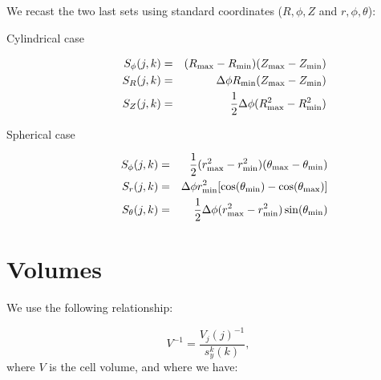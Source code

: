 \documentclass{article}
\begin{document}
We recast the two last sets using standard coordinates ($R,\phi,Z$ and $r,\phi,\theta$):
\begin{description}
\item[Cylindrical case] 
  \begin{eqnarray}
    \label{eq:3}
    S_\phi(j,k) &=& (R_{\rm max}-R_{\rm min})(Z_{\rm max}-Z_{\rm min})\\
    S_R(j,k) &=& \Delta \phi R_{\rm min}(Z_{\rm max}-Z_{\rm min})\\
    S_Z(j,k) &=& \frac 12\Delta\phi(R_{\rm max}^2-R_{\rm min}^2)
  \end{eqnarray}
\item[Spherical case] 
  \begin{eqnarray}
    \label{eq:4}
    S_\phi(j,k) &=& \frac 12(r_{\rm max}^2-r_{\rm min}^2)(\theta_{\rm max}-\theta_{\rm min})\\
    S_r(j,k) &=& \Delta \phi r_{\rm min}^2[\cos(\theta_{\rm min})-\cos(\theta_{\rm max})]\\
    S_\theta(j,k) &=& \frac 12\Delta \phi (r_{\rm max}^2-r_{\rm min}^2)\sin(\theta_{\rm min})
  \end{eqnarray}
\end{description}

\section{Volumes}

We use the following relationship:

\begin{equation}
  \label{eq:5}
  V^{-1}=\frac{V_j(j)^{-1}}{s_y^k(k)},
\end{equation}
where $V$ is the cell volume, and where we have:
\end{document}
